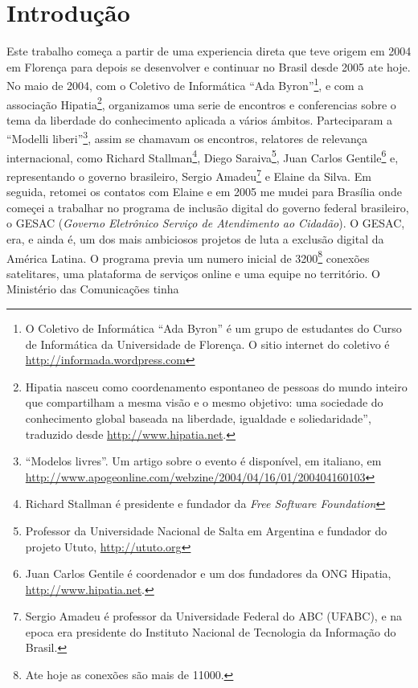 
\chapter{Introdução}
\label{Capitulo1}


Este trabalho começa a partir de uma experiencia direta que teve
origem em 2004 em Florença para depois se desenvolver e continuar no
Brasil desde 2005 ate hoje. No maio de 2004, com o Coletivo de
Informática ``Ada Byron''\footnote{O Coletivo de Informática ``Ada
  Byron'' é um grupo de estudantes do Curso de Informática da
  Universidade de Florença. O sitio internet do coletivo é
  \url{http://informada.wordpress.com}}, e com a associação
Hipatia\footnote{Hipatia nasceu como coordenamento espontaneo de
  pessoas do mundo inteiro que compartilham a mesma visão e o mesmo
  objetivo: uma sociedade do conhecimento global baseada na liberdade,
  igualdade e soliedaridade'', traduzido desde
  \url{http://www.hipatia.net}.}, organizamos uma serie de encontros e
conferencias sobre o tema da liberdade do conhecimento aplicada a
vários ámbitos. Parteciparam a ``Modelli liberi''\footnote{``Modelos
  livres''. Um artigo sobre o evento é disponível, em italiano, em
  \url{http://www.apogeonline.com/webzine/2004/04/16/01/200404160103}},
assim se chamavam os encontros, relatores de relevança internacional,
como Richard Stallman\footnote{Richard Stallman é presidente e
  fundador da \emph{Free Software Foundation}}, Diego
Saraiva\footnote{Professor da Universidade Nacional de Salta em
  Argentina e fundador do projeto Ututo, \url{http://ututo.org}}, Juan
Carlos Gentile\footnote{Juan Carlos Gentile é coordenador e um dos
  fundadores da ONG Hipatia, \url{http://www.hipatia.net}.} e,
representando o governo brasileiro, Sergio Amadeu\footnote{Sergio
  Amadeu é professor da Universidade Federal do ABC (UFABC), e na
  epoca era presidente do Instituto Nacional de Tecnologia da
  Informação do Brasil.} e Elaine da Silva. Em seguida, retomei os contatos com
Elaine e em 2005 me mudei para Brasília onde começei a trabalhar no
programa de inclusão digital do governo federal brasileiro, o GESAC
(\emph{Governo Eletrônico Serviço de Atendimento ao Cidadão}). O
GESAC, era, e ainda é, um dos mais ambiciosos projetos de luta a
exclusão digital da América Latina. O programa previa um numero
inicial de 3200\footnote{Ate hoje as conexões são mais de 11000.}
conexões satelitares, uma plataforma de serviços online e uma equipe
no território. O Ministério das Comunicações tinha 


